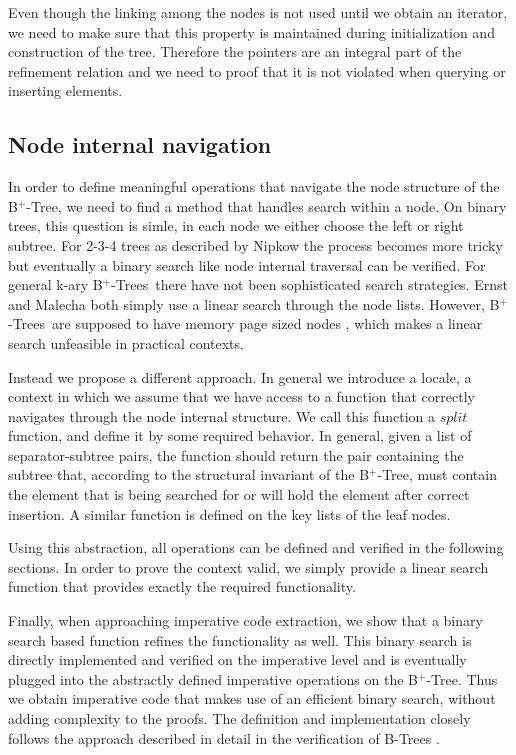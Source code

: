 \documentclass[a4paper,UKenglish,cleveref, autoref, thm-restate]{lipics-v2021}
\newcommand{\btree}{B$^+$-Tree}
\newcommand{\btrees}{B$^+$-Trees}
\begin{document}
Even though the linking among the nodes is not used until we obtain
an iterator, we need to make sure that this property is maintained
during initialization and construction of the tree.
Therefore the pointers are an integral part of the refinement relation
and we need to proof that it is not violated when querying or inserting elements.

\subsection{Node internal navigation}
\label{sec:split}

In order to define meaningful operations that navigate
the node structure of the \btree,
we need to find a method that handles search within a node.
On binary trees, this question is simle, in each node we either choose
the left or right subtree.
For 2-3-4 trees as described by Nipkow \cite{DBLP:conf/itp/Nipkow16} the process becomes more tricky
but eventually a binary search like node internal traversal can be verified.
For general k-ary \btrees\ there have not been sophisticated search strategies.
Ernst \cite{DBLP:journals/sosym/ErnstSR15} and Malecha \cite{DBLP:conf/popl/MalechaMSW10}
both simply use a linear search through the node lists.
However, \btrees\ are supposed to have memory page sized nodes \cite{DBLP:journals/csur/Comer79}, 
which makes a linear search unfeasible in practical contexts.

Instead we propose a different approach.
In general we introduce a locale, a context in which we assume that we
have access to a function that correctly navigates through the node internal structure.
We call this function a $split$ function, and define it by some required behavior.
In general, given a list of separator-subtree pairs, the function should
return the pair containing the subtree that, according to the structural invariant of the \btree,
must contain the element that is being searched for or will hold the element after correct insertion.
A similar function is defined on the key lists of the leaf nodes.

Using this abstraction, all operations can be defined and verified
in the following sections.
In order to prove the context valid, we simply provide a linear search function
that provides exactly the required functionality.

Finally, when approaching imperative code extraction,
we show that a binary search based function refines the
functionality as well.
This binary search is directly implemented and verified on the imperative
level and is eventually plugged into the abstractly defined
imperative operations on the \btree.
Thus we obtain imperative code that makes use of an efficient
binary search, without adding complexity to the proofs.
The definition and implementation closely follows
the approach described in detail in the
verification of B-Trees \cite{DBLP:journals/afp/Mundler21}.
\end{document}
